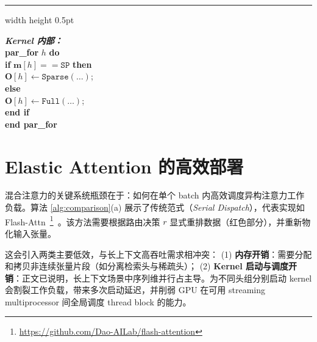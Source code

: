 \begin{algorithm}[t]
\begin{minipage}[t]{0.48\textwidth}
\begin{algorithmic}[1]
{                \vspace{0.3em}
                \hrule width \linewidth height 0.5pt \vspace{0.2em}

                \textbf{\textit{Kernel 内部：}} \\
                \textbf{par\_for} $h$ \textbf{do} \\
                \hspace*{1em} \textbf{if} $\mathbf{m}[h] {==} \texttt{SP}$ \textbf{then} \\
                \hspace*{2em} $\mathbf{O}[h] \leftarrow \texttt{Sparse}(\dots)$; \\
                \hspace*{1em} \textbf{else} \\
                \hspace*{2em} $\mathbf{O}[h] \leftarrow \texttt{Full}(\dots)$; \\
                \hspace*{1em} \textbf{end if} \\
                \textbf{end par\_for}
            }
        \end{algorithmic}
    \end{minipage}
\end{algorithm}
\section{Elastic Attention 的高效部署}
\label{appdix:deployment}


混合注意力的关键系统瓶颈在于：如何在单个 batch 内高效调度异构注意力工作负载。算法 \ref{alg:comparison}(a) 展示了传统范式（\textit{Serial Dispatch}），代表实现如 Flash-Attn~\footnote{\url{https://github.com/Dao-AILab/flash-attention}}~\citep{dao2023flashattention2}。该方法需要根据路由决策 $r$ 显式重排数据（红色部分），并重新物化输入张量。

这会引入两类主要低效，与长上下文高吞吐需求相冲突：
(1) \textbf{内存开销}：需要分配和拷贝非连续张量片段（如分离检索头与稀疏头）；
(2) \textbf{Kernel 启动与调度开销}：正文已说明，长上下文场景中序列维并行占主导。为不同头组分别启动 kernel 会割裂工作负载，带来多次启动延迟，并削弱 GPU 在可用 streaming multiprocessor 间全局调度 thread block 的能力。

